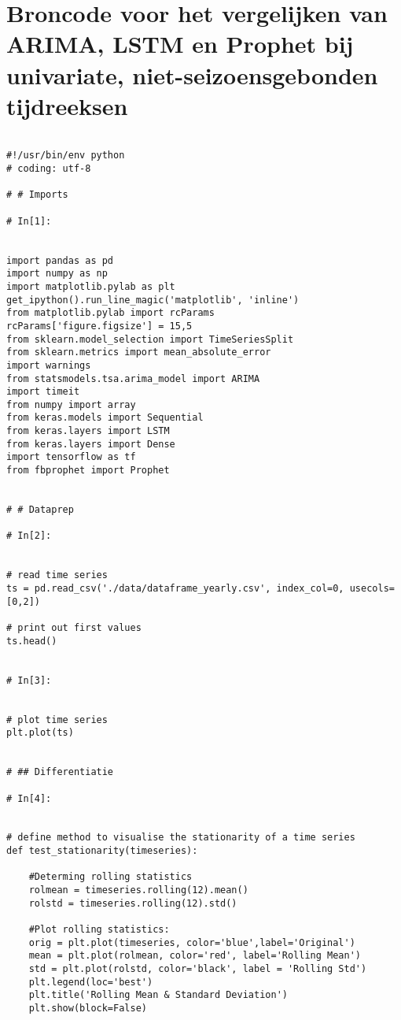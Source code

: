 \clearpage
\section{Broncode voor het vergelijken van ARIMA, LSTM en Prophet bij univariate, niet-seizoensgebonden tijdreeksen}  %
\begin{verbatim}

#!/usr/bin/env python
# coding: utf-8

# # Imports 

# In[1]:


import pandas as pd
import numpy as np
import matplotlib.pylab as plt
get_ipython().run_line_magic('matplotlib', 'inline')
from matplotlib.pylab import rcParams
rcParams['figure.figsize'] = 15,5
from sklearn.model_selection import TimeSeriesSplit
from sklearn.metrics import mean_absolute_error
import warnings
from statsmodels.tsa.arima_model import ARIMA
import timeit
from numpy import array
from keras.models import Sequential
from keras.layers import LSTM
from keras.layers import Dense
import tensorflow as tf
from fbprophet import Prophet


# # Dataprep

# In[2]:


# read time series
ts = pd.read_csv('./data/dataframe_yearly.csv', index_col=0, usecols=[0,2])

# print out first values
ts.head()


# In[3]:


# plot time series
plt.plot(ts)


# ## Differentiatie

# In[4]:


# define method to visualise the stationarity of a time series
def test_stationarity(timeseries):
    
    #Determing rolling statistics
    rolmean = timeseries.rolling(12).mean()
    rolstd = timeseries.rolling(12).std()

    #Plot rolling statistics:
    orig = plt.plot(timeseries, color='blue',label='Original')
    mean = plt.plot(rolmean, color='red', label='Rolling Mean')
    std = plt.plot(rolstd, color='black', label = 'Rolling Std')
    plt.legend(loc='best')
    plt.title('Rolling Mean & Standard Deviation')
    plt.show(block=False)
    

\end{verbatim}

